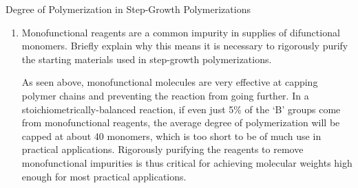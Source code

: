 \begin{activity}{Degree of Polymerization in Step-Growth Polymerizations}
\begin{exercises}
\begin{enumerate}
\begin{solution}{}
					\end{solution}
				
				\item Monofunctional reagents are a common impurity in supplies of difunctional monomers. Briefly explain why this means it is necessary to rigorously purify the starting materials used in step-growth polymerizations.
				
					\begin{solution}{}
						As seen above, monofunctional molecules are very effective at capping polymer chains and preventing the reaction from going further.  In a stoichiometrically-balanced reaction, if even just 5\% of the `B' groups come from monofunctional reagents, the average degree of polymerization will be capped at about 40 monomers, which is too short to be of much use in practical applications.  Rigorously purifying the reagents to remove monofunctional impurities is thus critical for achieving molecular weights high enough for most practical applications.
					\end{solution}
			\end{enumerate}
\end{exercises}
	
\end{activity}